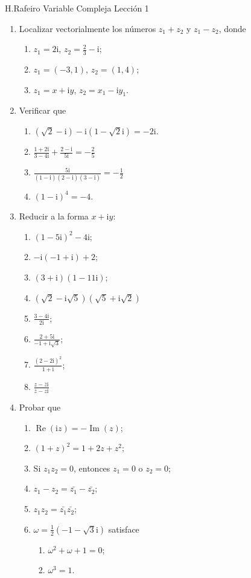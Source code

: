 \documentclass[12pt]{article}
\newcommand{\ii}{\mathrm i}
\DeclareMathOperator{\re}{Re}
\DeclareMathOperator{\im}{Im}
\begin{document}
\noindent H.Rafeiro \hfill Variable Compleja \hfill Lección 1

\begin{enumerate}
	\item Localizar vectorialmente los números $z_1+z_2$ y $z_1-z_2$, donde
		\begin{enumerate}
			\item $z_1=2\ii$, $z_2= \frac{2}{3}-\ii$;
			\item $z_1=(-3,1)$, $z_2=(1,4)$;
			\item $z_1= x+\ii y$, $z_2= x_1-\ii y_1$.
		\end{enumerate}

	\item Verificar que
		\begin{enumerate}
			\item $\left( \sqrt 2-\ii \right)-\ii \left( 1-\sqrt 2\ii \right)=-2\ii$.
			\item $ \frac{1+2\ii}{3-4\ii} + \frac{2-\ii}{5\ii}= -\frac{2}{5}$
			\item $\frac{5\ii}{(1-\ii)(2-\ii)(3-\ii)}= -\frac{1}{2}$
			\item $(1-\ii)^4=-4$.
		\end{enumerate}
	\item Reducir a la forma $x+\ii y$:
		\begin{enumerate}
			\item  $\left( 1-5\ii \right)^2 -4\ii$;
			\item $-\ii \left( -1 +\ii \right)+2$;
			\item $\left( 3+\ii \right)\left( 1-11\ii \right)$;
			\item $(\sqrt{2}-\ii \sqrt{5}) (\sqrt{5}+\ii \sqrt{2})$  
			\item $\frac{3-4\ii}{2\ii}$;
			\item $\frac{2+5\ii}{-1+\ii \sqrt{3}}$;
			\item $\frac{\left( 2-2\ii \right)^2}{1+\ii}$;
			\item $\frac{z-\bar{z}\ii}{\bar z-z\ii}$
		\end{enumerate}
	\item Probar que
		\begin{enumerate}
			\item $\re (\ii z)= -\im (z)$; 
			\item $\left( 1+z \right)^2=1 + 2z+z^2$;
			\item Si $z_1z_2=0$, entonces $z_1=0$ o $z_2=0$;
			\item $z_1-z_2= \bar {z_1}-\bar{z_2}$;
			\item $z_1z_2= \bar{z_1} \bar {z_2}$;
			\item $\omega= \frac{1}{2} \left( -1-\sqrt{3}\ii \right)$ satisface
				\begin{enumerate}
					\item $\omega^2+\omega+1=0$;
					\item $\omega^3=1$.
				\end{enumerate}
		\end{enumerate}
\end{enumerate}
\end{document}
